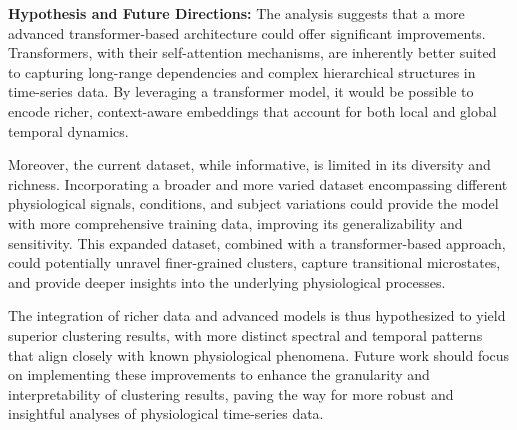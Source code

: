 \documentclass[a4paper,12pt,twoside]{article}
\begin{document}
\textbf{Hypothesis and Future Directions:}
The analysis suggests that a more advanced transformer-based architecture could offer significant improvements. Transformers, with their self-attention mechanisms, are inherently better suited to capturing long-range dependencies and complex hierarchical structures in time-series data. By leveraging a transformer model, it would be possible to encode richer, context-aware embeddings that account for both local and global temporal dynamics.

Moreover, the current dataset, while informative, is limited in its diversity and richness. Incorporating a broader and more varied dataset encompassing different physiological signals, conditions, and subject variations could provide the model with more comprehensive training data, improving its generalizability and sensitivity. This expanded dataset, combined with a transformer-based approach, could potentially unravel finer-grained clusters, capture transitional microstates, and provide deeper insights into the underlying physiological processes.

The integration of richer data and advanced models is thus hypothesized to yield superior clustering results, with more distinct spectral and temporal patterns that align closely with known physiological phenomena. Future work should focus on implementing these improvements to enhance the granularity and interpretability of clustering results, paving the way for more robust and insightful analyses of physiological time-series data.
\end{document}
